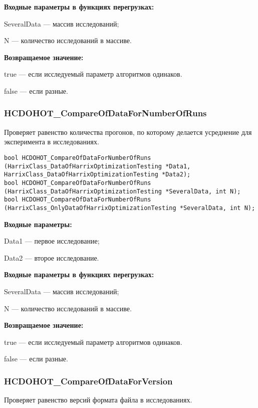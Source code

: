 \documentclass[a4paper,12pt]{article}
\begin{document}
\textbf{Входные параметры в функциях перегрузках:}

SeveralData --- массив исследований;

N --- количество исследований в массиве.

\textbf{Возвращаемое значение:}

true --- если исследуемый параметр алгоритмов одинаков.

false --- если разные.


\subsubsection{HCDOHOT\_CompareOfDataForNumberOfRuns}\label{HCDOHOT_CompareOfDataForNumberOfRuns}

Проверяет равенство количества прогонов, по которому делается усреднение для эксперимента в исследованиях.


\begin{lstlisting}[label=code_syntax_HCDOHOT_CompareOfDataForNumberOfRuns,caption=Синтаксис]
bool HCDOHOT_CompareOfDataForNumberOfRuns (HarrixClass_DataOfHarrixOptimizationTesting *Data1, HarrixClass_DataOfHarrixOptimizationTesting *Data2);
bool HCDOHOT_CompareOfDataForNumberOfRuns (HarrixClass_DataOfHarrixOptimizationTesting *SeveralData, int N);
bool HCDOHOT_CompareOfDataForNumberOfRuns (HarrixClass_OnlyDataOfHarrixOptimizationTesting *SeveralData, int N);
\end{lstlisting}

\textbf{Входные параметры:}

Data1 --- первое исследование;

Data2 --- второе исследование.

\textbf{Входные параметры в функциях перегрузках:}

SeveralData --- массив исследований;

N --- количество исследований в массиве.

\textbf{Возвращаемое значение:}

true --- если исследуемый параметр алгоритмов одинаков.

false --- если разные.


\subsubsection{HCDOHOT\_CompareOfDataForVersion}\label{HCDOHOT_CompareOfDataForVersion}

Проверяет равенство версий формата файла в исследованиях.
\end{document}
